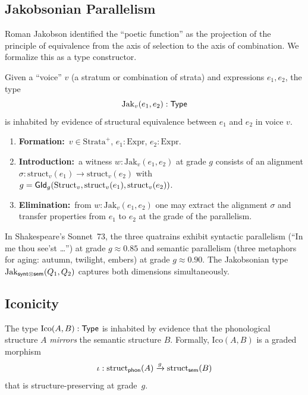 \subsection{Jakobsonian Parallelism}
\label{subsec:jak}

Roman Jakobson identified the ``poetic function'' as the projection
of the principle of equivalence from the axis of selection to the
axis of combination.  We formalize this as a type constructor.

\begin{definition}
\label{def:jak}
Given a ``voice'' $v$ (a stratum or combination of strata) and
expressions $e_1, e_2$, the type
\[
  \mathrm{Jak}_v(e_1, e_2) : \mathsf{Type}
\]
is inhabited by evidence of structural equivalence between $e_1$
and $e_2$ in voice $v$.
\begin{enumerate}[label=(\alph*)]
\item \textbf{Formation:}\ $v \in \mathrm{Strata}^+$,
  $e_1 : \mathrm{Expr}$, $e_2 : \mathrm{Expr}$.
\item \textbf{Introduction:}\ a witness
  $w : \mathrm{Jak}_v(e_1, e_2)$ at grade $g$ consists of an
  alignment $\sigma : \mathrm{struct}_v(e_1) \to
  \mathrm{struct}_v(e_2)$ with
  $g = \mathsf{GId}_g(\mathrm{Struct}_v, \mathrm{struct}_v(e_1),
  \mathrm{struct}_v(e_2))$.
\item \textbf{Elimination:}\ from $w : \mathrm{Jak}_v(e_1,e_2)$
  one may extract the alignment $\sigma$ and transfer properties
  from $e_1$ to $e_2$ at the grade of the parallelism.
\end{enumerate}
\end{definition}

\begin{example}
In Shakespeare's Sonnet~73, the three quatrains exhibit syntactic
parallelism (``In me thou see'st \ldots'') at grade $g \approx 0.85$
and semantic parallelism (three metaphors for aging: autumn, twilight,
embers) at grade $g \approx 0.90$.  The Jakobsonian type
$\mathrm{Jak}_{\mathsf{synt} \otimes \mathsf{sem}}(Q_1, Q_2)$ captures both dimensions
simultaneously.
\end{example}

\subsection{Iconicity}
\label{subsec:ico}

\begin{definition}
\label{def:ico}
The type $\mathrm{Ico}(A, B) : \mathsf{Type}$ is inhabited by evidence that
the phonological structure $A$ \emph{mirrors} the semantic structure
$B$.  Formally, $\mathrm{Ico}(A,B)$ is a graded morphism
\[
  \iota : \mathrm{struct}_{\mathsf{phon}}(A)
  \xrightarrow{g} \mathrm{struct}_{\mathsf{sem}}(B)
\]
that is structure-preserving at grade~$g$.
\end{definition}


